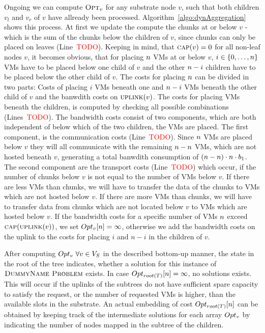 \documentclass[9pt,twocolumn]{scrartcl}
\newcommand{\Capacity}{\ensuremath{\textsc{cap}}}
\newcommand{\Problem}{\textsc{DummyName Problem}}
\newcommand{\carlo}[1]{\textcolor{red}{#1}}
\newcommand{\SubstrateNodes}{\ensuremath{V_S}}
\newcommand{\SubstrateNode}{\ensuremath{v}}
\newcommand{\Tree}{\ensuremath{T}}
\newcommand{\CostCom}{\ensuremath{b_1}}
\newcommand{\Vms}{\ensuremath{n}}
\begin{document}
Ongoing we can compute $\OPT_\SubstrateNode$ for any substrate node
$\SubstrateNode$, such that both children $\SubstrateNode_l$ and
$\SubstrateNode_r$ of $\SubstrateNode$ have allready been processed.
Algorithm~\ref{algo:dynAggregation} shows this process. At first we update the
compute the chunks at or below $\SubstrateNode$ - which is the sum of the
chunks below the children of $\SubstrateNode$, since chunks can only be placed
on leaves (Line~\carlo{TODO}). Keeping in mind, that $\Capacity(\SubstrateNode)
= 0$ for all non-leaf nodes $\SubstrateNode$, it becomes obvious, that for
placing $n$ VMs at or below $\SubstrateNode$, $i\in\{0,\dots,
n\}$ VMs have to be placed below one child of $\SubstrateNode$ and the
other $n - i$ children have to be placed below the other child of
$\SubstrateNode$. The costs for placing $n$ can be divided in two
parts: Costs of placing $i$ VMs beneath one and $n - i$ VMs beneath the
other child of $\SubstrateNode$ and the banwdith costs on
$\Uplink(\SubstrateNode)$. The costs for placing VMs beneath the children, is
computed by checking all possible combinations (Lines~\carlo{TODO}). The
bandwidth costs consist of two components, which are both independent of below
which of the two children, the VMs are placed. The first component, is the
communication costs (Line~\carlo{TODO}). Since $n$ VMs are placed below
$\SubstrateNode$ they will all communicate with the remaining $\Vms - \SumIndex$
VMs, which are not hosted beneath $\SubstrateNode$, generating a total banwdith
consumption of $(\Vms - \SumIndex)\cdot \SumIndex \cdot \CostCom$. The
second component are the transport costs (Line~\carlo{TODO}) which occur, if
the number of chunks below $\SubstrateNode$ is not equal to the number of VMs
below $\SubstrateNode$. If there are less VMs than chunks, we will have to
transfer the data of the chunks to VMs which are not hosted below
$\SubstrateNode$. If there are more VMs than chunks, we will have to transfer
data from chunks which are not located below $\SubstrateNode$ to VMs which are
hosted below $\SubstrateNode$. If the bandwidth costs for a specific number of
VMs $n$ exceed $\Capacity(\Uplink(\SubstrateNode))$, we set
$\Opt_\SubstrateNode[\SumIndex] = \infty$, otherwise we add the bandwidth costs
on the uplink to the costs for placing $i$ and $\Vms - i$ in the children of
$\SubstrateNode$.

After computing $\Opt_\SubstrateNode~\forall
\SubstrateNode \in \SubstrateNodes$ in the described bottom-up manner, the
state in the root of the tree indicates, whether a solution for this instance
of $\Problem$ exists. In case $\Opt_{root(\Tree)}[\Vms] = \infty$, no solutions
exists. This will occur if the uplinks of the subtrees do not have sufficient
spare capacity to satisfy the request, or the number of requested VMs is higher,
than the available slots in the substrate. An actual embedding of cost
$\Opt_{root(\Tree)}[\Vms]$ can be obtained by keeping track of the intermediate
solutions for each array $\Opt_\SubstrateNode$ by indicating the number of
nodes mapped in the subtree of the children.
\end{document}
